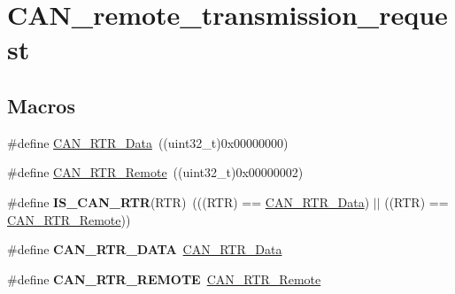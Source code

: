 \hypertarget{group___c_a_n__remote__transmission__request}{}\section{C\+A\+N\+\_\+remote\+\_\+transmission\+\_\+request}
\label{group___c_a_n__remote__transmission__request}
\subsection*{Macros}
\begin{DoxyCompactItemize}
\item 
\#define \hyperlink{group___c_a_n__remote__transmission__request_ga2407c3a8b2cd97bd651143aa959219f1}{C\+A\+N\+\_\+\+R\+T\+R\+\_\+\+Data}~((uint32\+\_\+t)0x00000000)
\item 
\#define \hyperlink{group___c_a_n__remote__transmission__request_ga42e95ddfb02d88c82de84058fb0fb349}{C\+A\+N\+\_\+\+R\+T\+R\+\_\+\+Remote}~((uint32\+\_\+t)0x00000002)
\item 
\hypertarget{group___c_a_n__remote__transmission__request_ga3379997ad4da6fc4d7975c52b891bdc0}{}\#define {\bfseries I\+S\+\_\+\+C\+A\+N\+\_\+\+R\+T\+R}(R\+T\+R)~(((R\+T\+R) == \hyperlink{group___c_a_n__remote__transmission__request_ga2407c3a8b2cd97bd651143aa959219f1}{C\+A\+N\+\_\+\+R\+T\+R\+\_\+\+Data}) $\vert$$\vert$ ((R\+T\+R) == \hyperlink{group___c_a_n__remote__transmission__request_ga42e95ddfb02d88c82de84058fb0fb349}{C\+A\+N\+\_\+\+R\+T\+R\+\_\+\+Remote}))\label{group___c_a_n__remote__transmission__request_ga3379997ad4da6fc4d7975c52b891bdc0}

\item 
\hypertarget{group___c_a_n__remote__transmission__request_gab1e89074b4fcfebf81c323909625b0d0}{}\#define {\bfseries C\+A\+N\+\_\+\+R\+T\+R\+\_\+\+D\+A\+T\+A}~\hyperlink{group___c_a_n__remote__transmission__request_ga2407c3a8b2cd97bd651143aa959219f1}{C\+A\+N\+\_\+\+R\+T\+R\+\_\+\+Data}\label{group___c_a_n__remote__transmission__request_gab1e89074b4fcfebf81c323909625b0d0}

\item 
\hypertarget{group___c_a_n__remote__transmission__request_gab15c649e3e497c6d1145bb98ff7f3f04}{}\#define {\bfseries C\+A\+N\+\_\+\+R\+T\+R\+\_\+\+R\+E\+M\+O\+T\+E}~\hyperlink{group___c_a_n__remote__transmission__request_ga42e95ddfb02d88c82de84058fb0fb349}{C\+A\+N\+\_\+\+R\+T\+R\+\_\+\+Remote}\label{group___c_a_n__remote__transmission__request_gab15c649e3e497c6d1145bb98ff7f3f04}

\end{DoxyCompactItemize}


